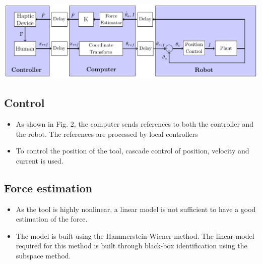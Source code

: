 \begin{center}
\includegraphics[width=\textwidth]{../Worksheets/rapport/pictures/control.pdf} 
	
	\vspace{-2mm}
	\captionsetup{font=tiny}
\end{center}




\begin{minipage}{0.45\linewidth}
\subsection*{Control}
\begin{itemize}
\item As shown in Fig. 2, the computer sends references to both the controller and the robot. 
The references are processed by local controllers
\item To control the position of the tool, cascade control of position, velocity and current is used.
\end{itemize}
\end{minipage}
\hspace{5mm}
\begin{minipage}{0.45\linewidth}
\subsection*{Force estimation}
\begin{itemize}
	\item As the tool is highly nonlinear, a linear model is not sufficient to have a good estimation of the force.
	\item The model is built using the Hammerstein-Wiener method. The linear model required for this method is built through black-box identification using the subspace method.
\end{itemize}
\end{minipage}
